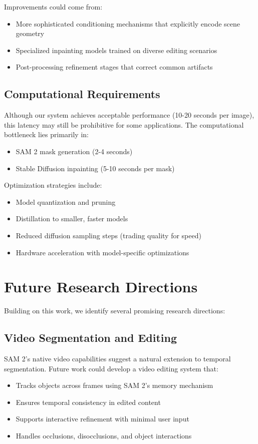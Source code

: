 Improvements could come from:
\begin{itemize}
    \item More sophisticated conditioning mechanisms that explicitly encode scene geometry
    \item Specialized inpainting models trained on diverse editing scenarios
    \item Post-processing refinement stages that correct common artifacts
\end{itemize}

\subsection{Computational Requirements}

Although our system achieves acceptable performance (10-20 seconds per image), this latency may still be prohibitive for some applications. The computational bottleneck lies primarily in:
\begin{itemize}
    \item SAM 2 mask generation (2-4 seconds)
    \item Stable Diffusion inpainting (5-10 seconds per mask)
\end{itemize}

Optimization strategies include:
\begin{itemize}
    \item Model quantization and pruning
    \item Distillation to smaller, faster models
    \item Reduced diffusion sampling steps (trading quality for speed)
    \item Hardware acceleration with model-specific optimizations
\end{itemize}

\section{Future Research Directions}

Building on this work, we identify several promising research directions:

\subsection{Video Segmentation and Editing}

SAM 2's native video capabilities suggest a natural extension to temporal segmentation. Future work could develop a video editing system that:
\begin{itemize}
    \item Tracks objects across frames using SAM 2's memory mechanism
    \item Ensures temporal consistency in edited content
    \item Supports interactive refinement with minimal user input
    \item Handles occlusions, disocclusions, and object interactions
\end{itemize}

